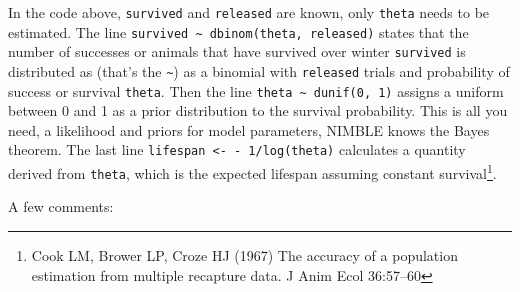 \documentclass[
  12pt,
]{krantz}
\begin{document}
In the code above, \texttt{survived} and \texttt{released} are known, only \texttt{theta} needs to be estimated. The line \texttt{survived\ \textasciitilde{}\ dbinom(theta,\ released)} states that the number of successes or animals that have survived over winter \texttt{survived} is distributed as (that's the \texttt{\textasciitilde{}}) as a binomial with \texttt{released} trials and probability of success or survival \texttt{theta}. Then the line \texttt{theta\ \textasciitilde{}\ dunif(0,\ 1)} assigns a uniform between 0 and 1 as a prior distribution to the survival probability. This is all you need, a likelihood and priors for model parameters, NIMBLE knows the Bayes theorem. The last line \texttt{lifespan\ \textless{}-\ -\ 1/log(theta)} calculates a quantity derived from \texttt{theta}, which is the expected lifespan assuming constant survival\footnote{Cook LM, Brower LP, Croze HJ (1967) The accuracy of a population estimation from multiple recapture data. J Anim Ecol 36:57--60}.

A few comments:
\end{document}
